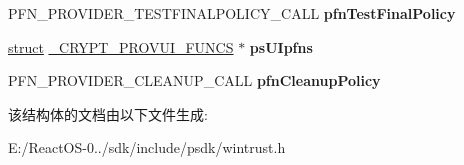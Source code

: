 \begin{DoxyCompactItemize}
\item 
\mbox{\label{struct___c_r_y_p_t___p_r_o_v_i_d_e_r___f_u_n_c_t_i_o_n_s_a2a7a9d78dfe10d369432b55ced30a45a}} 
P\+F\+N\+\_\+\+P\+R\+O\+V\+I\+D\+E\+R\+\_\+\+T\+E\+S\+T\+F\+I\+N\+A\+L\+P\+O\+L\+I\+C\+Y\+\_\+\+C\+A\+LL {\bfseries pfn\+Test\+Final\+Policy}
\item 
\mbox{\label{struct___c_r_y_p_t___p_r_o_v_i_d_e_r___f_u_n_c_t_i_o_n_s_ae4721feda0dd2075acc6e456f943f469}} 
\hyperlink{interfacestruct}{struct} \hyperlink{struct___c_r_y_p_t___p_r_o_v_u_i___f_u_n_c_s}{\+\_\+\+C\+R\+Y\+P\+T\+\_\+\+P\+R\+O\+V\+U\+I\+\_\+\+F\+U\+N\+CS} $\ast$ {\bfseries ps\+U\+Ipfns}
\item 
\mbox{\label{struct___c_r_y_p_t___p_r_o_v_i_d_e_r___f_u_n_c_t_i_o_n_s_a0fbc0c6a19b83b45f0cd22f2673a64fe}} 
P\+F\+N\+\_\+\+P\+R\+O\+V\+I\+D\+E\+R\+\_\+\+C\+L\+E\+A\+N\+U\+P\+\_\+\+C\+A\+LL {\bfseries pfn\+Cleanup\+Policy}
\end{DoxyCompactItemize}


该结构体的文档由以下文件生成\+:\begin{DoxyCompactItemize}
\item 
E\+:/\+React\+O\+S-\/0../sdk/include/psdk/wintrust.\+h\end{DoxyCompactItemize}
